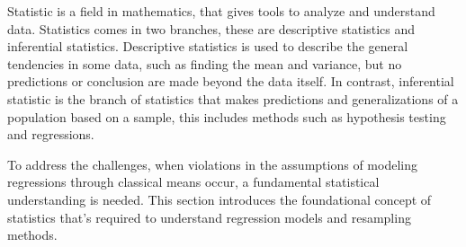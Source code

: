 Statistic is a field in mathematics, that gives tools to analyze and understand data. Statistics comes in two branches, these are descriptive statistics and inferential statistics. Descriptive statistics is used to describe the general tendencies in some data, such as finding the mean and variance, but no predictions or conclusion are made beyond the data itself. In contrast, inferential statistic is the branch of statistics that makes predictions and generalizations of a population based on a sample, this includes methods such as hypothesis testing and regressions. 

To address the challenges, when violations in the assumptions of modeling regressions through classical means occur, a fundamental statistical understanding is needed. This section introduces the foundational concept of statistics that's required to understand regression models and resampling methods.






